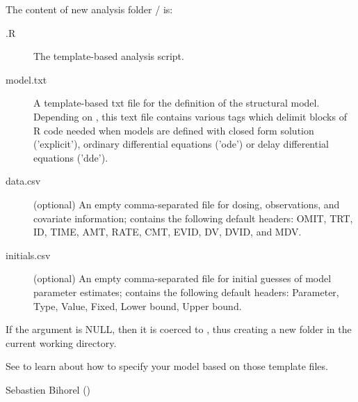 \begin{Details}\relax
The content of new  analysis folder /
is:\begin{description}

\item[.R] The template-based  analysis script.
\item[model.txt] A template-based txt file for the definition of the
structural model. Depending on , this text file contains
various tags which delimit blocks of R code needed when models are defined
with closed form solution ('explicit'), ordinary differential equations 
('ode') or delay differential equations ('dde').
\item[data.csv] (optional) An empty comma-separated file for dosing, 
observations, and covariate information; contains the following default
headers: OMIT, TRT, ID, TIME, AMT, RATE, CMT, EVID, DV, DVID, and MDV.
\item[initials.csv] (optional) An empty comma-separated file for initial
guesses of model parameter estimates; contains the following default
headers: Parameter, Type, Value, Fixed, Lower bound, Upper bound.

\end{description}


If the  argument is NULL, then it is coerced to , thus 
creating a new folder in the current working directory.

See  to learn about how to
specify your model based on those template files.
\end{Details}
%
\begin{Author}\relax
Sebastien Bihorel ()
\end{Author}
